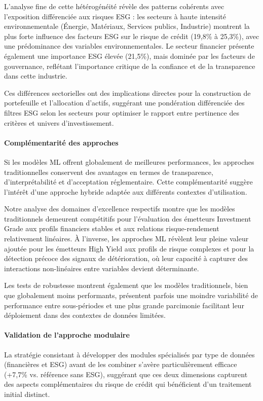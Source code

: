 L'analyse fine de cette hétérogénéité révèle des patterns cohérents avec l'exposition différenciée aux risques ESG : les secteurs à haute intensité environnementale (Énergie, Matériaux, Services publics, Industrie) montrent la plus forte influence des facteurs ESG sur le risque de crédit (19,8\% à 25,3\%), avec une prédominance des variables environnementales. Le secteur financier présente également une importance ESG élevée (21,5\%), mais dominée par les facteurs de gouvernance, reflétant l'importance critique de la confiance et de la transparence dans cette industrie.

Ces différences sectorielles ont des implications directes pour la construction de portefeuille et l'allocation d'actifs, suggérant une pondération différenciée des filtres ESG selon les secteurs pour optimiser le rapport entre pertinence des critères et univers d'investissement.

\paragraph{Complémentarité des approches} 
Si les modèles ML offrent globalement de meilleures performances, les approches traditionnelles conservent des avantages en termes de transparence, d'interprétabilité et d'acceptation réglementaire. Cette complémentarité suggère l'intérêt d'une approche hybride adaptée aux différents contextes d'utilisation.

Notre analyse des domaines d'excellence respectifs montre que les modèles traditionnels demeurent compétitifs pour l'évaluation des émetteurs Investment Grade aux profils financiers stables et aux relations risque-rendement relativement linéaires. À l'inverse, les approches ML révèlent leur pleine valeur ajoutée pour les émetteurs High Yield aux profils de risque complexes et pour la détection précoce des signaux de détérioration, où leur capacité à capturer des interactions non-linéaires entre variables devient déterminante.

Les tests de robustesse montrent également que les modèles traditionnels, bien que globalement moins performants, présentent parfois une moindre variabilité de performance entre sous-périodes et une plus grande parcimonie facilitant leur déploiement dans des contextes de données limitées.

\paragraph{Validation de l'approche modulaire} 
La stratégie consistant à développer des modules spécialisés par type de données (financières et ESG) avant de les combiner s'avère particulièrement efficace (+7,7\% vs. référence sans ESG), suggérant que ces deux dimensions capturent des aspects complémentaires du risque de crédit qui bénéficient d'un traitement initial distinct.

